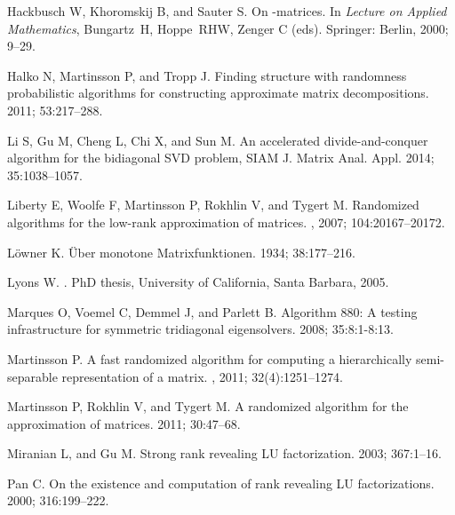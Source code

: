 \documentclass[times]{nlaauth}
\newcounter{algorithm}
\begin{document}
\begin{thebibliography}{99}
{  Hackbusch W, Khoromskij B, and Sauter S.}
\newblock On -matrices.
\newblock In {\em Lecture on Applied Mathematics\/},
  Bungartz~H, Hoppe~RHW, Zenger C (eds). Springer: Berlin, 2000;  9--29.



{  Halko N, Martinsson P, and Tropp J.}
\newblock Finding structure with randomness probabilistic algorithms for
  constructing approximate matrix decompositions.
 2011;  53:217--288.

{  Li S, Gu M, Cheng L, Chi X, and Sun M.}
\newblock An accelerated divide-and-conquer algorithm for the bidiagonal SVD
  problem,
\newblock SIAM J. Matrix Anal. Appl. 2014; 35:1038--1057.

{  Liberty E, Woolfe F, Martinsson P, Rokhlin V, and Tygert M.}
\newblock Randomized algorithms for the low-rank approximation of matrices.
, 2007;  104:20167--20172.

{  L\"{o}wner K.}
\newblock \"{U}ber monotone {Matrixfunktionen}.
 1934; 38:177--216.

{  Lyons W.}
.
\newblock PhD thesis, University of California, Santa Barbara, 2005.

{  Marques O, Voemel C, Demmel J, and Parlett B.}
\newblock Algorithm 880: A testing infrastructure for symmetric tridiagonal
  eigensolvers.
 2008; 35:8:1-8:13.

{  Martinsson P.}
\newblock A fast randomized algorithm for computing a hierarchically
  semi-separable representation of a matrix.
, 2011; 32(4):1251--1274.

{  Martinsson P, Rokhlin V, and Tygert M.}
\newblock A randomized algorithm for the approximation of matrices.
 2011;  30:47--68.

{  Miranian L, and Gu M.}
\newblock Strong rank revealing {LU} factorization.
 2003; 367:1--16.

{  Pan C.}
\newblock On the existence and computation of rank revealing {LU}
  factorizations.
 2000;  316:199--222.


\end{thebibliography}
\end{document}
